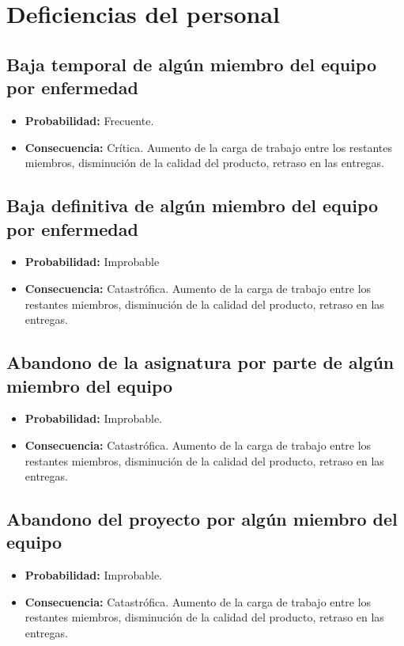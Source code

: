 \documentclass[spanish,a4paper,12pt]{report}	%
\begin{document}
\section{Deficiencias del personal}
%

\subsection*{Baja temporal de algún miembro del equipo por enfermedad}
	\begin{itemize}
		\item \textbf {Probabilidad: }Frecuente.
		\item \textbf {Consecuencia: }Crítica. Aumento de la carga de trabajo entre los restantes miembros, disminución de la calidad del producto, retraso en las entregas.
	\end{itemize}

\subsection*{Baja definitiva de algún miembro del equipo por enfermedad}	
	\begin{itemize}
		\item \textbf {Probabilidad: }Improbable
		\item \textbf {Consecuencia: }Catastrófica. Aumento de la carga de trabajo entre los restantes miembros, disminución de la calidad del producto, retraso en las entregas.
	\end{itemize}

\subsection*{Abandono de la asignatura por parte de algún miembro del equipo}	
	\begin{itemize}
		\item \textbf {Probabilidad: }Improbable.
		\item \textbf {Consecuencia: }Catastrófica. Aumento de la carga de trabajo entre los restantes miembros, disminución de la calidad del producto, retraso en las entregas.
	\end{itemize}

\subsection*{Abandono del proyecto por algún miembro del equipo}	
	\begin{itemize}
		\item \textbf {Probabilidad: }Improbable.
		\item \textbf {Consecuencia: }Catastrófica. Aumento de la carga de trabajo entre los restantes miembros, disminución de la calidad del producto, retraso en las entregas.
	\end{itemize}
\end{document}
